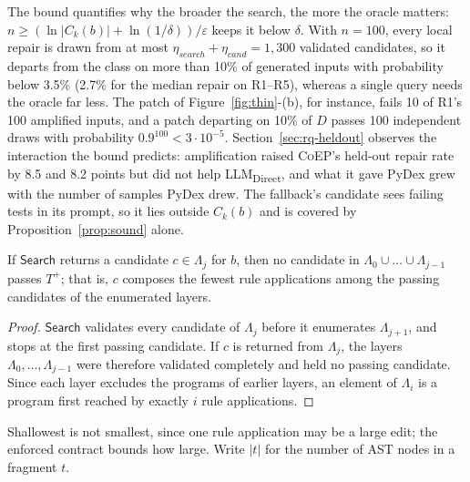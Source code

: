 \documentclass[acmsmall,screen,review,anonymous,nonacm]{acmart}
\newcommand{\tool}{\textsc{CoEP}\xspace}
\newcommand{\direct}{LLM\textsubscript{Direct}\xspace}
\newcommand{\aux}[1]{\ensuremath{\mathsf{#1}}}
\newcommand{\V}[1]{\ensuremath{\mathit{#1}}}
\begin{document}
The bound quantifies why the broader the search, the more the oracle matters: $n \ge (\ln |C_k(b)| + \ln(1/\delta))/\varepsilon$ keeps it below $\delta$. With $n = 100$, every local repair is drawn from at most $\eta_{\V{search}} + \eta_{\V{cand}} = 1{,}300$ validated candidates, so it departs from the class on more than 10\% of generated inputs with probability below 3.5\% (2.7\% for the median repair on R1--R5), whereas a single query needs the oracle far less. The patch of Figure~\ref{fig:thin}-(b), for instance, fails 10 of R1's 100 amplified inputs, and a patch departing on 10\% of $D$ passes 100 independent draws with probability $0.9^{100} < 3 \cdot 10^{-5}$. Section~\ref{sec:rq-heldout} observes the interaction the bound predicts: amplification raised \tool's held-out repair rate by 8.5 and 8.2 points but did not help \direct, and what it gave PyDex grew with the number of samples PyDex drew. The fallback's candidate sees failing tests in its prompt, so it lies outside $C_k(b)$ and is covered by Proposition~\ref{prop:sound} alone.

\begin{proposition}\label{prop:shallow}
If \aux{Search} returns a candidate $c \in \Lambda_j$ for $b$, then no candidate in $\Lambda_0 \cup \dots \cup \Lambda_{j-1}$ passes $T^{+}$; that is, $c$ composes the fewest rule applications among the passing candidates of the enumerated layers.
\end{proposition}
\begin{proof}
\aux{Search} validates every candidate of $\Lambda_j$ before it enumerates $\Lambda_{j+1}$, and stops at the first passing candidate. If $c$ is returned from $\Lambda_j$, the layers $\Lambda_0, \dots, \Lambda_{j-1}$ were therefore validated completely and held no passing candidate. Since each layer excludes the programs of earlier layers, an element of $\Lambda_i$ is a program first reached by exactly $i$ rule applications.
\end{proof}
Shallowest is not smallest, since one rule application may be a large edit; the enforced contract bounds how large. Write $|t|$ for the number of AST nodes in a fragment $t$.
\end{document}
